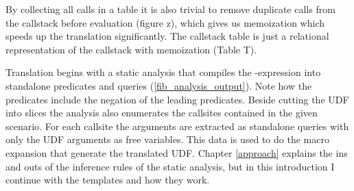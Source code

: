 By collecting all calls in a table it is also trivial to remove duplicate calls from the callstack before evaluation (figure z), which gives us memoization which speeds up the translation significantly. The callstack table is just a relational representation of the callstack with memoization (Table T).


Translation begins with a static analysis that compiles the \CASE-expression into standalone predicates and queries (\autoref{fib_analysis_output}). Note how the predicates include the negation of the leading predicates. Beside cutting the UDF into slices the analysis also enumerates the callsites contained in the given scenario. For each callsite the arguments are extracted as standalone queries with only the UDF arguments as free variables. This data is used to do the macro expansion that generate the translated UDF. Chapter \autoref{approach} explains the ins and outs of the inference rules of the static analysis, but in this introduction I continue with the templates and how they work.




